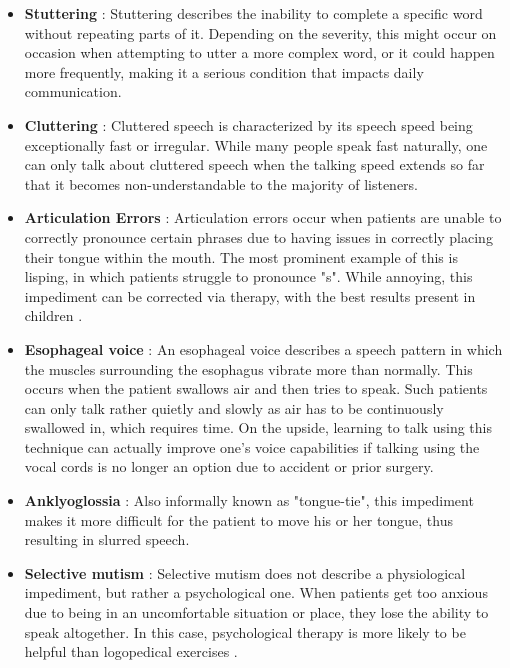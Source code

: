 \documentclass[draft,final]{vutinfth} %
\begin{document}
\begin{itemize}
\item \textbf{Stuttering} \cite{atakpaassessment, balaji2015speech}: Stuttering describes the inability to complete a specific word without repeating parts of it. Depending on the severity, this might occur on occasion when attempting to utter a more complex word, or it could happen more frequently, making it a serious condition that impacts daily communication. 

\item \textbf{Cluttering} \cite{balaji2015speech}: Cluttered speech is characterized by its speech speed being exceptionally fast or irregular. While many people speak fast naturally, one can only talk about cluttered speech when the talking speed extends so far that it becomes non-understandable to the majority of listeners.

\item \textbf{Articulation Errors} \cite{atakpaassessment}: Articulation errors occur when patients are unable to correctly pronounce certain phrases due to having issues in correctly placing their tongue within the mouth. The most prominent example of this is lisping, in which patients struggle to pronounce "s". While annoying, this impediment can be corrected via therapy, with the best results present in children \cite{proestler2023}.

\item \textbf{Esophageal voice} \cite{balaji2015speech}: An esophageal voice describes a speech pattern in which the muscles surrounding the esophagus vibrate more than normally. This occurs when the patient swallows air and then tries to speak. Such patients can only talk rather quietly and slowly as air has to be continuously swallowed in, which requires time. On the upside, learning to talk using this technique can actually improve one's voice capabilities if talking using the vocal cords is no longer an option due to accident or prior surgery.

\item \textbf{Anklyoglossia} \cite{atakpaassessment}: Also informally known as "tongue-tie", this impediment makes it more difficult for the patient to move his or her tongue, thus resulting in slurred speech.

\item \textbf{Selective mutism} \cite{atakpaassessment}: Selective mutism does not describe a physiological impediment, but rather a psychological one. When patients get too anxious due to being in an uncomfortable situation or place, they lose the ability to speak altogether. In this case, psychological therapy is more likely to be helpful than logopedical exercises \cite{proestler2023}.


\end{itemize}
\end{document}

